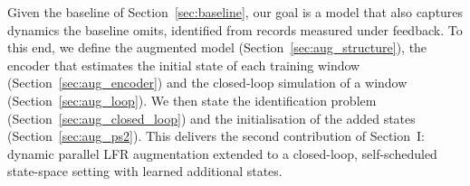 Given the baseline of Section~\ref{sec:baseline}, our goal is a model that also
captures dynamics the baseline omits, identified from records measured under
feedback.
To this end, we define the augmented model (Section~\ref{sec:aug_structure}),
the encoder that estimates the initial state of each training window
(Section~\ref{sec:aug_encoder}) and the closed-loop simulation of a window
(Section~\ref{sec:aug_loop}).
We then state the identification problem (Section~\ref{sec:aug_closed_loop})
and the initialisation of the added states (Section~\ref{sec:aug_ps2}).
This delivers the second contribution of Section~I: dynamic parallel LFR
augmentation extended to a closed-loop, self-scheduled state-space setting with
learned additional states.


